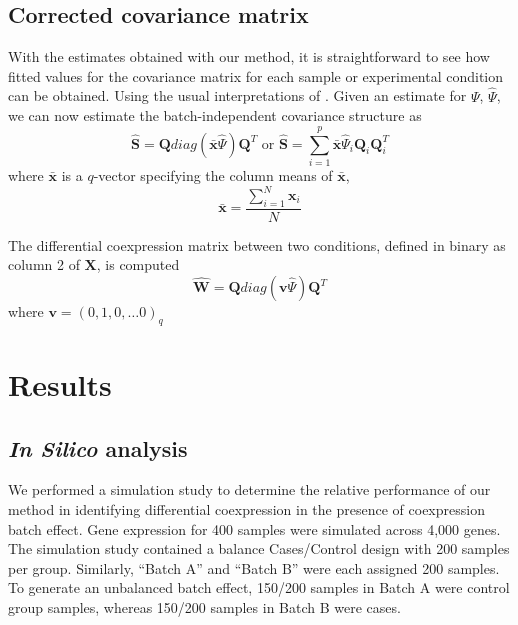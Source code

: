 \subsection{Corrected covariance matrix}

With the estimates obtained with our method, it is straightforward
to see how fitted values for the covariance matrix for each sample
or experimental condition can be obtained. Using the usual interpretations
of . Given an estimate for $\Psi$, $\hat{\Psi}$, we can now estimate
the batch-independent covariance structure as 
\begin{equation}
\hat{\mathbf{S}}=\mathbf{Q}diag\left(\bar{\mathbf{x}}\hat{\Psi}\right)\mathbf{Q}^{T}\text{ or }\hat{\mathbf{S}}=\sum_{i=1}^{p}\bar{\mathbf{x}}\hat{\Psi}_{i}\mathbf{Q}_{i}\mathbf{Q}_{i}^{T}\label{eq:corrected_coexpression}
\end{equation}
 where $\bar{\mathbf{x}}$ is a $q$-vector specifying the column
means of $\bar{\mathbf{x}}$,
\[
\bar{\mathbf{x}}=\frac{\sum_{i=1}^{N}\mathbf{x}_{i}}{N}
\]

The differential coexpression matrix between two conditions, defined
in binary as column 2 of $\mathbf{X}$, is computed
\begin{equation}
\hat{\mathbf{W}}=\mathbf{Q}diag\left(\mathbf{v}\hat{\Psi}\right)\mathbf{Q}^{T}\label{eq:parameter_interpretation}
\end{equation}
where $\mathbf{v}=\left(0,1,0,\dots0\right)_{q}$

\section{Results}

\subsection{\emph{In Silico} analysis}

We performed a simulation study to determine the relative performance
of our method in identifying differential coexpression in the presence
of coexpression batch effect. Gene expression for 400 samples were
simulated across 4,000 genes. The simulation study contained a balance
Cases/Control design with 200 samples per group. Similarly, ``Batch
A'' and ``Batch B'' were each assigned 200 samples. To generate
an unbalanced batch effect, 150/200 samples in Batch A were control
group samples, whereas 150/200 samples in Batch B were cases. 

